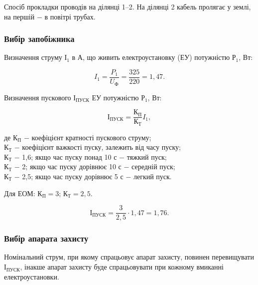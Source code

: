 Спосіб прокладки проводів на ділянці 1–2. На ділянці 2 кабель пролягає у землі, на першій $-$ в повітрі трубах.

\subsubsection{Вибір запобіжника}

Визначення струму $І_{1}$ в А, що живить електроустановку (ЕУ) потужністю $Р_{1}$, Вт:

\[
	I_{1} = \frac{P_{1}}{U_{\text{Ф}}}=\frac{325}{220}=1,47.
\]

\vspace{1.5em}

Визначення пускового $І_{\text{ПУСК}}$ ЕУ потужністю $Р_{\text{1}}$, Вт:

\begin{equation}\label{eq:work3}
	І_{\text{ПУСК}} = \frac{\text{К}_{\text{П}}}{\text{К}_{\text{Т}}} I_{1},
\end{equation}

\noindent де $\text{К}_{\text{П}}$ $-$ коефіцієнт кратності пускового струму; \\
\hspace*{15pt} $\text{К}_{\text{Т}}$ $-$ коефіцієнт важкості пуску, залежить від часу пуску; \\
\hspace*{15pt} $\text{К}_{\text{Т}}$ $-$ 1,6; якщо час пуску понад 10 с $-$ тяжкий пуск; \\
\hspace*{15pt} $\text{К}_{\text{Т}}$ $-$ 2; якщо час пуску дорівнює 10 с $-$ середній пуск; \\
\hspace*{15pt} $\text{К}_{\text{Т}}$ $-$ 2,5; якщо час пуску дорівнює 5 с $-$ легкий пуск. \\

\vspace{1.5em}

Для ЕОМ: $\text{К}_{\text{П}} = 3; \, \text{К}_{\text{Т}} = 2,5$.

\[
	І_{\text{ПУСК}} = \frac{3}{2,5} \cdot 1,47 = 1,76.
\]

\vspace{1.5em}

\subsubsection{Вибір апарата захисту}

Номінальний струм, при якому спрацьовує апарат захисту, повинен перевищувати $\text{І}_{\text{ПУСК}}$, інакше апарат захисту буде спрацьовувати при кожному вмиканні електроустановки.

